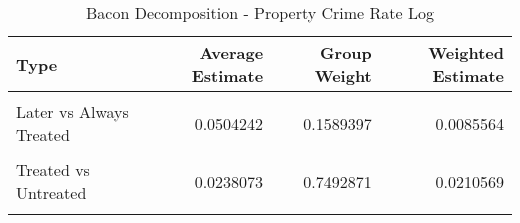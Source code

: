 \begin{table}[H]

\caption{\label{tab:tab:bacondecompositionProperty}Bacon Decomposition - Property Crime Rate Log}
\centering
\begin{tabular}[t]{lrrr}
\toprule
Type & Average Estimate & Group Weight & Weighted Estimate\\
\midrule
\cellcolor{gray!6}{Earlier vs Later Treated} & \cellcolor{gray!6}{0.0036098} & \cellcolor{gray!6}{0.0683810} & \cellcolor{gray!6}{-0.0007191}\\
Later vs Always Treated & 0.0504242 & 0.1589397 & 0.0085564\\
\cellcolor{gray!6}{Later vs Earlier Treated} & \cellcolor{gray!6}{0.0490119} & \cellcolor{gray!6}{0.0233921} & \cellcolor{gray!6}{0.0001507}\\
Treated vs Untreated & 0.0238073 & 0.7492871 & 0.0210569\\
\cellcolor{gray!6}{Total TWFE} & \cellcolor{gray!6}{NaN} & \cellcolor{gray!6}{NaN} & \cellcolor{gray!6}{0.0290449}\\
\bottomrule
\end{tabular}
\end{table}
